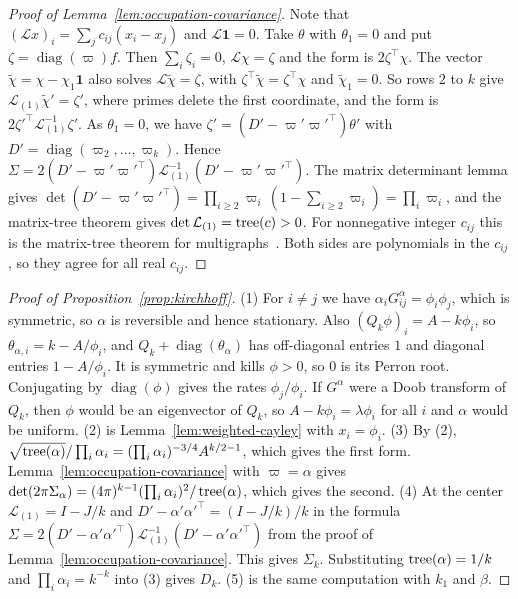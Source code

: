 \begin{proof}[Proof of Lemma~\ref{lem:occupation-covariance}]
Note that $(\mathcal Lx)_i=\sum_jc_{ij}(x_i-x_j)$ and $\mathcal L\mathbf1=0$. Take
$\theta$ with $\theta_1=0$ and put $\zeta=\operatorname{diag}(\varpi)f$. Then
$\sum_i\zeta_i=0$, $\mathcal L\chi=\zeta$ and the form is $2\zeta^\top\chi$. The
vector $\tilde\chi=\chi-\chi_1\mathbf1$ also solves $\mathcal L\tilde\chi=\zeta$,
with $\zeta^\top\tilde\chi=\zeta^\top\chi$ and $\tilde\chi_1=0$. So rows $2$ to
$k$ give $\mathcal L_{(1)}\tilde\chi'=\zeta'$, where primes delete the first
coordinate, and the form is $2\zeta'^\top\mathcal L_{(1)}^{-1}\zeta'$. As
$\theta_1=0$, we have $\zeta'=(D'-\varpi'\varpi'^\top)\theta'$ with
$D'=\operatorname{diag}(\varpi_2,\ldots,\varpi_k)$. Hence
$\Sigma=2(D'-\varpi'\varpi'^\top)\mathcal L_{(1)}^{-1}(D'-\varpi'\varpi'^\top)$. The
matrix determinant lemma gives
$\det(D'-\varpi'\varpi'^\top)=\prod_{i\ge2}\varpi_i\,(1-\sum_{i\ge2}\varpi_i)=\prod_i\varpi_i$,
and the matrix-tree theorem gives $\det\mathcal L_{(1)}=\operatorname{tree}(c)>0$. For
nonnegative integer $c_{ij}$ this is the matrix-tree theorem for
multigraphs~\cite{bollobas1998}. Both sides are polynomials in the $c_{ij}$, so
they agree for all real $c_{ij}$.
\end{proof}

\begin{proof}[Proof of Proposition~\ref{prop:kirchhoff}]
(1) For $i\ne j$ we have $\alpha_iG^\alpha_{ij}=\phi_i\phi_j$, which is symmetric, so
$\alpha$ is reversible and hence stationary. Also $(Q_k\phi)_i=A-k\phi_i$, so
$\theta_{\alpha,i}=k-A/\phi_i$, and $Q_k+\operatorname{diag}(\theta_\alpha)$ has
off-diagonal entries $1$ and diagonal entries $1-A/\phi_i$. It is symmetric and
kills $\phi>0$, so $0$ is its Perron root. Conjugating by $\operatorname{diag}(\phi)$
gives the rates $\phi_j/\phi_i$. If $G^\alpha$ were a Doob transform of $Q_k$, then $\phi$
would be an eigenvector of $Q_k$, so $A-k\phi_i=\lambda\phi_i$ for all $i$ and $\alpha$
would be uniform.
(2) is Lemma~\ref{lem:weighted-cayley} with $x_i=\phi_i$.
(3) By (2), $\sqrt{\operatorname{tree}(\alpha)}/\prod_i\alpha_i=(\prod_i\alpha_i)^{-3/4}A^{k/2-1}$,
which gives the first form. Lemma~\ref{lem:occupation-covariance} with $\varpi=\alpha$
gives $\det(2\pi\Sigma_\alpha)=(4\pi)^{k-1}(\prod_i\alpha_i)^2/\operatorname{tree}(\alpha)$, which
gives the second.
(4) At the center $\mathcal L_{(1)}=I-J/k$ and $D'-\alpha'\alpha'^\top=(I-J/k)/k$
in the formula $\Sigma=2(D'-\alpha'\alpha'^\top)\mathcal L_{(1)}^{-1}
(D'-\alpha'\alpha'^\top)$ from the proof of
Lemma~\ref{lem:occupation-covariance}. This gives $\Sigma_k$. Substituting
$\operatorname{tree}(\alpha)=1/k$ and $\prod_i\alpha_i=k^{-k}$ into (3) gives $D_k$.
(5) is the same computation with $k_1$ and $\beta$.
\end{proof}

